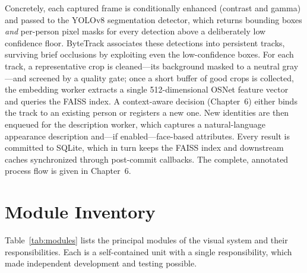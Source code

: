 \documentclass[12pt]{report}
\begin{document}
Concretely, each captured frame is conditionally enhanced (contrast and gamma) and passed to the YOLOv8 segmentation detector, which returns bounding boxes \emph{and} per-person pixel masks for every detection above a deliberately low confidence floor. ByteTrack associates these detections into persistent tracks, surviving brief occlusions by exploiting even the low-confidence boxes. For each track, a representative crop is cleaned---its background masked to a neutral gray---and screened by a quality gate; once a short buffer of good crops is collected, the embedding worker extracts a single 512-dimensional OSNet feature vector and queries the FAISS index. A context-aware decision (Chapter~6) either binds the track to an existing person or registers a new one. New identities are then enqueued for the description worker, which captures a natural-language appearance description and---if enabled---face-based attributes. Every result is committed to SQLite, which in turn keeps the FAISS index and downstream caches synchronized through post-commit callbacks. The complete, annotated process flow is given in Chapter~6.

\section{Module Inventory}
Table~\ref{tab:modules} lists the principal modules of the visual system and their responsibilities. Each is a self-contained unit with a single responsibility, which made independent development and testing possible.
\end{document}
